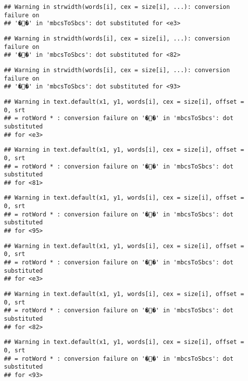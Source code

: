 \documentclass[]{article}
\begin{document}
\begin{verbatim}
## Warning in strwidth(words[i], cex = size[i], ...): conversion failure on
## '��' in 'mbcsToSbcs': dot substituted for <e3>
\end{verbatim}

\begin{verbatim}
## Warning in strwidth(words[i], cex = size[i], ...): conversion failure on
## '��' in 'mbcsToSbcs': dot substituted for <82>
\end{verbatim}

\begin{verbatim}
## Warning in strwidth(words[i], cex = size[i], ...): conversion failure on
## '��' in 'mbcsToSbcs': dot substituted for <93>
\end{verbatim}

\begin{verbatim}
## Warning in text.default(x1, y1, words[i], cex = size[i], offset = 0, srt
## = rotWord * : conversion failure on '��' in 'mbcsToSbcs': dot substituted
## for <e3>
\end{verbatim}

\begin{verbatim}
## Warning in text.default(x1, y1, words[i], cex = size[i], offset = 0, srt
## = rotWord * : conversion failure on '��' in 'mbcsToSbcs': dot substituted
## for <81>
\end{verbatim}

\begin{verbatim}
## Warning in text.default(x1, y1, words[i], cex = size[i], offset = 0, srt
## = rotWord * : conversion failure on '��' in 'mbcsToSbcs': dot substituted
## for <95>
\end{verbatim}

\begin{verbatim}
## Warning in text.default(x1, y1, words[i], cex = size[i], offset = 0, srt
## = rotWord * : conversion failure on '��' in 'mbcsToSbcs': dot substituted
## for <e3>
\end{verbatim}

\begin{verbatim}
## Warning in text.default(x1, y1, words[i], cex = size[i], offset = 0, srt
## = rotWord * : conversion failure on '��' in 'mbcsToSbcs': dot substituted
## for <82>
\end{verbatim}

\begin{verbatim}
## Warning in text.default(x1, y1, words[i], cex = size[i], offset = 0, srt
## = rotWord * : conversion failure on '��' in 'mbcsToSbcs': dot substituted
## for <93>
\end{verbatim}
\end{document}
